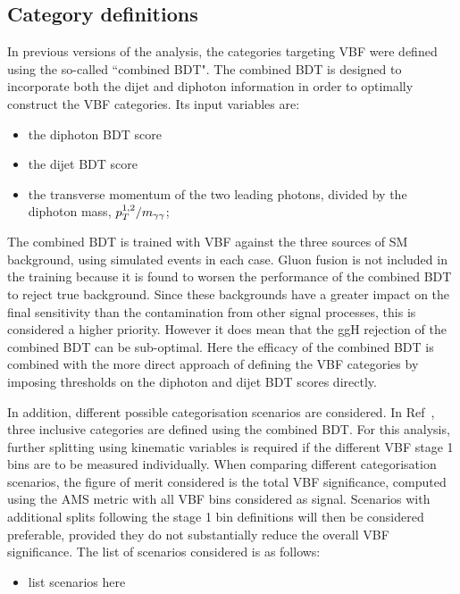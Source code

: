 
\subsection{Category definitions}


In previous versions of the analysis, 
the categories targeting VBF were defined using the so-called ``combined BDT".
The combined BDT is designed to incorporate both the dijet and diphoton information 
in order to optimally construct the VBF categories.
Its input variables are:
\begin{itemize}
\item the diphoton BDT score
\item the dijet BDT score
\item the transverse momentum of the two leading photons, divided by the diphoton mass, $p_T^{1,2}/m_{\gamma\gamma}$;
\end{itemize}
The combined BDT is trained with VBF against the three sources of SM background, 
using simulated events in each case.
Gluon fusion is not included in the training because it is found to worsen the performance 
of the combined BDT to reject true background.
Since these backgrounds have a greater impact on the final sensitivity 
than the contamination from other signal processes, 
this is considered a higher priority.
However it does mean that the ggH rejection of the combined BDT can be sub-optimal.
Here the efficacy of the combined BDT is combined with the more direct approach of 
defining the VBF categories by imposing thresholds on the diphoton and dijet BDT scores directly.

In addition, different possible categorisation scenarios are considered.
In Ref~\cite{HIG-16-040}, three inclusive categories are defined using the combined BDT.
For this analysis, further splitting using kinematic variables is required 
if the different VBF stage 1 bins are to be measured individually.
When comparing different categorisation scenarios,
the figure of merit considered is the total VBF significance, 
computed using the AMS metric with all VBF bins considered as signal.
Scenarios with additional splits following the stage 1 bin definitions 
will then be considered preferable, 
provided they do not substantially reduce the overall VBF significance.
The list of scenarios considered is as follows:
\begin{itemize}
\item list scenarios here
\end{itemize}

